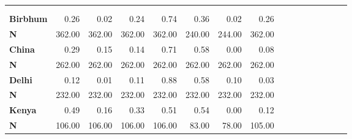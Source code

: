 \begin{tabular}{@{\extracolsep{5pt}}lrrrrrrrrrrrrrrr}
\toprule
&  &  &  &  &  &  &  \\
{\bf } &  &  &  &  &  &  &  \\
\hline
{\bf Birbhum} & 0.26\phantom{***} & 0.02\phantom{***} & 0.24\phantom{***} & 0.74\phantom{***} & 0.36\phantom{***} & 0.02\phantom{***} & 0.26\phantom{***} \\
{\bf N} & 362.00\phantom{***} & 362.00\phantom{***} & 362.00\phantom{***} & 362.00\phantom{***} & 240.00\phantom{***} & 244.00\phantom{***} & 362.00\phantom{***} \\
{\bf China} & 0.29\phantom{***} & 0.15\phantom{***} & 0.14\phantom{***} & 0.71\phantom{***} & 0.58\phantom{***} & 0.00\phantom{***} & 0.08\phantom{***} \\
{\bf N} & 262.00\phantom{***} & 262.00\phantom{***} & 262.00\phantom{***} & 262.00\phantom{***} & 262.00\phantom{***} & 262.00\phantom{***} & 262.00\phantom{***} \\
{\bf Delhi} & 0.12\phantom{***} & 0.01\phantom{***} & 0.11\phantom{***} & 0.88\phantom{***} & 0.58\phantom{***} & 0.10\phantom{***} & 0.03\phantom{***} \\
{\bf N} & 232.00\phantom{***} & 232.00\phantom{***} & 232.00\phantom{***} & 232.00\phantom{***} & 232.00\phantom{***} & 232.00\phantom{***} & 232.00\phantom{***} \\
{\bf Kenya} & 0.49\phantom{***} & 0.16\phantom{***} & 0.33\phantom{***} & 0.51\phantom{***} & 0.54\phantom{***} & 0.00\phantom{***} & 0.12\phantom{***} \\
{\bf N} & 106.00\phantom{***} & 106.00\phantom{***} & 106.00\phantom{***} & 106.00\phantom{***} & 83.00\phantom{***} & 78.00\phantom{***} & 105.00\phantom{***} \\

\end{tabular}
